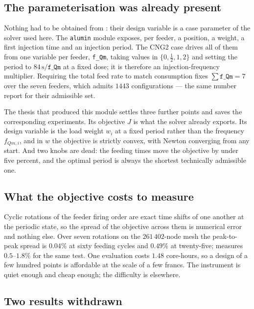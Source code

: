 \documentclass[11pt,a4paper]{article}
\theoremstyle{plain}
\theoremstyle{definition}
\theoremstyle{remark}
\begin{document}
\subsection{The parameterisation was already present}

Nothing had to be obtained from \cite{patouillet}: their design variable is a
case parameter of the solver used here. The \texttt{alumin} module exposes, per
feeder, a position, a weight, a first injection time and an injection period. The CNG2 case drives all of them from one
variable per feeder, \texttt{f\_Qm}, taking values in $\{0,\tfrac12,1,2\}$ and
setting the period to $84\,\mathrm{s}/\texttt{f\_Qm}$ at a fixed dose; it is
therefore an injection-frequency multiplier. Requiring the total feed rate to
match consumption fixes $\sum \texttt{f\_Qm} = 7$ over the seven feeders, which
admits $1443$ configurations --- the same number \cite{patouillet} report for
their admissible set.

The thesis that produced this module \cite{hofer} settles three further points
and saves the corresponding experiments. Its objective $J$ is what the solver already
exports. Its design variable is the load weight $w_i$ at a fixed
period rather than the frequency $f_{Qm,i}$, and in $w$ the objective is strictly
convex, with Newton converging from any start. And two knobs are dead: the feeding times move
the objective by under five percent, and the optimal period is always the
shortest technically admissible one.

\subsection{What the objective costs to measure}
\label{sec:feeding-floor}

Cyclic rotations of the feeder firing order are exact time shifts of one another
at the periodic state, so the spread of the objective across them is numerical
error and nothing else. Over seven rotations on the $261\,402$-node mesh the
peak-to-peak spread is $0.04\%$ at sixty feeding cycles and $0.49\%$ at
twenty-five; \cite{hofer} measures $0.5$--$1.8\%$ for the same test. One
evaluation costs $1.48$ core-hours, so a design of a few hundred points is
affordable at the scale of a few francs. The instrument is quiet enough and cheap
enough; the difficulty is elsewhere.

\subsection{Two results withdrawn}
\end{document}
